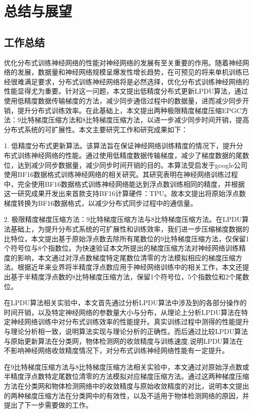 \chapter{总结与展望}
\section{工作总结}
优化分布式训练神经网络的性能对神经网络的发展有至关重要的作用。随着神经网络的发展，数据量和神经网络规模呈爆发性增长趋势，在可预见的将来单机训练已经很难满足要求，分布式训练神经网络将是必然选择，优化分布式训练神经网络的性能显得尤为重要。针对这一问题，本文提出低精度分布式更新LPDU算法，通过使用低精度数据传输梯度的方法，减少同步通信过程中的数据量，进而减少同步开销，提升分布式训练效率。在此基础上，本文提出两种极限精度梯度压缩EPGC方法：9比特梯度压缩方法和8比特梯度压缩方法，以进一步减少同步时间开销，提高分布式系统的可扩展性。本文主要研究工作和研究成果如下：

1. 低精度分布式更新算法。该算法旨在保证神经网络训练精度的情况下，提升分布式训练神经网络的性能。通过使用低精度数据传输梯度，减少了梯度数据的尾数位，达到减少同步数据量，减少同步时间开销的目的。本算法受启发于google公司使用BF16数据格式训练神经网络的相关研究。其研究表明在神经网络训练过程中，完全使用BF16数据格式训练神经网络能达到浮点数训练相同的精度，并根据这一研究成果开发出来首款支持BF16计算硬件：TPU。故本文提出将原始浮点数梯度转换为BF16数据格式，以减少分布式同步过程中的通信量。

2. 极限精度梯度压缩方法：9比特梯度压缩方法与8比特梯度压缩方法。在LPDU算法基础上，为提升分布式系统的可扩展性和训练效率，我们进一步压缩梯度数据的比特位，本文提出基于原始浮点数去除所有尾数位的9比特梯度压缩方法，仅保留1个符号位与8个指数位。为快速验证本文所提出的梯度压缩方法对神经网络训练精度的影响，本文通过对浮点数梯度特定尾数位清零的方法模拟相应的梯度压缩方法。根据近年来业界将半精度浮点数应用于神经网络训练中的相关工作，本文还提出基于半精度浮点数的8比特梯度压缩方法，保留1个符号位，5个指数位和2个尾数位。

在LPDU算法相关实验中，本文首先通过分析LPDU算法中涉及到的各部分操作的时间开销，以及特定神经网络的参数量大小与分布，从理论上分析LPDU算法在特定神经网络训练中对分布式训练效率的性能提升。真实训练过程中测得的性能提升与理论分析相一致，说明算法实现与理论分析的正确性。而后通过比较LPDU算法与原始更新算法在分类网，物体检测网的收敛精度与训练速度,说明LPDU算法在不影响神经网络收敛精度情况下，对分布式训练神经网络性能有一定提升。

在9比特梯度压缩方法与8比特梯度压缩方法相关实验中，本文通过对原始浮点数或半精度浮点数特定尾数位清零的方法模拟对应梯度压缩方法。通过这两种梯度压缩方法在分类网和物体检测网络中的收敛精度与原始收敛精度的对比，说明本文提出的两种梯度压缩方法在分类网中的有效性，以及不适用于物体检测网络的原因，并提出了下一步需要做的工作。
